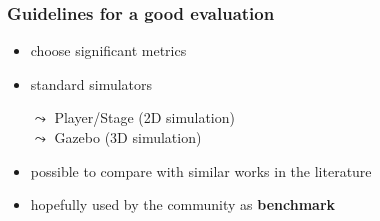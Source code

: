 \begin{frame}
	\frametitle{Guidelines for a good evaluation}
	
	\Large
	
	\begin{itemize}
		\item choose significant metrics
		
		\item standard simulators
		
		\vspace{-0.2cm}
		
		\begin{tabbing}
			\normalsize
			\hspace*{0.4cm}
			$ \leadsto $ Player/Stage (2D simulation) \\
			
			\normalsize
			\hspace*{0.4cm}
			$ \leadsto $ Gazebo (3D simulation)
		\end{tabbing}
		
		\item possible to compare with similar works in the literature
		
		\item hopefully used by the community as \textbf{benchmark}
	\end{itemize}
\end{frame}

